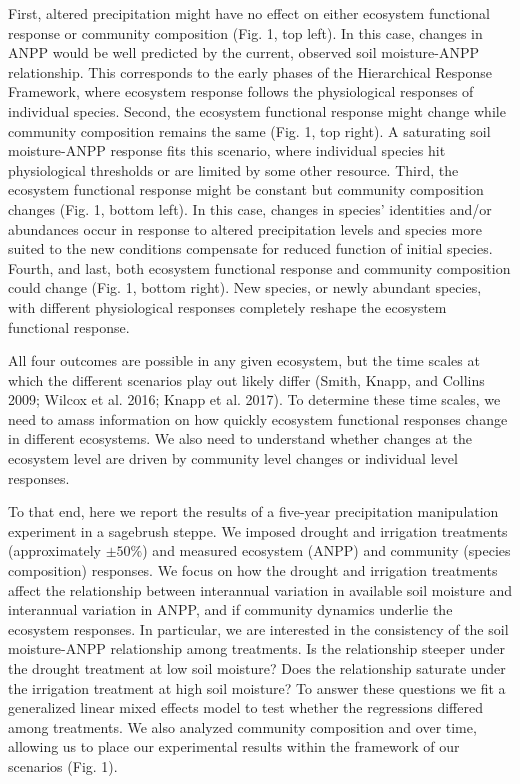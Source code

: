 \documentclass[fleqn,10pt,lineno]{wlpeerj} %
\begin{document}
First, altered precipitation might have no effect on either ecosystem
functional response or community composition (Fig. 1, top left). In this
case, changes in ANPP would be well predicted by the current, observed
soil moisture-ANPP relationship. This corresponds to the early phases of
the Hierarchical Response Framework, where ecosystem response follows
the physiological responses of individual species. Second, the ecosystem
functional response might change while community composition remains the
same (Fig. 1, top right). A saturating soil moisture-ANPP response fits
this scenario, where individual species hit physiological thresholds or
are limited by some other resource. Third, the ecosystem functional
response might be constant but community composition changes (Fig. 1,
bottom left). In this case, changes in species' identities and/or
abundances occur in response to altered precipitation levels and species
more suited to the new conditions compensate for reduced function of
initial species. Fourth, and last, both ecosystem functional response
and community composition could change (Fig. 1, bottom right). New
species, or newly abundant species, with different physiological
responses completely reshape the ecosystem functional response.

All four outcomes are possible in any given ecosystem, but the time
scales at which the different scenarios play out likely differ (Smith,
Knapp, and Collins 2009; Wilcox et al. 2016; Knapp et al. 2017). To
determine these time scales, we need to amass information on how quickly
ecosystem functional responses change in different ecosystems. We also
need to understand whether changes at the ecosystem level are driven by
community level changes or individual level responses.

To that end, here we report the results of a five-year precipitation
manipulation experiment in a sagebrush steppe. We imposed drought and
irrigation treatments (approximately \(\pm50\%\)) and measured ecosystem
(ANPP) and community (species composition) responses. We focus on how
the drought and irrigation treatments affect the relationship between
interannual variation in available soil moisture and interannual
variation in ANPP, and if community dynamics underlie the ecosystem
responses. In particular, we are interested in the consistency of the
soil moisture-ANPP relationship among treatments. Is the relationship
steeper under the drought treatment at low soil moisture? Does the
relationship saturate under the irrigation treatment at high soil
moisture? To answer these questions we fit a generalized linear mixed
effects model to test whether the regressions differed among treatments.
We also analyzed community composition and
 over
time, allowing us to place our experimental results within the framework
of our scenarios (Fig. 1).
\end{document}
